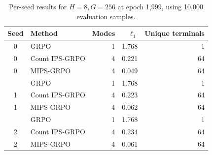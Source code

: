 \begin{table}[htbp]
\centering
\caption{Per-seed results for \(H=8,G=256\) at epoch 1,999, using 10,000
evaluation samples.}
\begin{tabular}{clrrr}
\toprule
Seed & Method & Modes & \(\ell_1\) & Unique terminals \\
\midrule
0 & GRPO & 1 & 1.768 & 1 \\
0 & Count IPS-GRPO & 4 & 0.221 & 64 \\
0 & MIPS-GRPO & 4 & 0.049 & 64 \\
\addlinespace
1 & GRPO & 1 & 1.768 & 1 \\
1 & Count IPS-GRPO & 4 & 0.223 & 64 \\
1 & MIPS-GRPO & 4 & 0.062 & 64 \\
\addlinespace
2 & GRPO & 1 & 1.768 & 1 \\
2 & Count IPS-GRPO & 4 & 0.234 & 64 \\
2 & MIPS-GRPO & 4 & 0.061 & 64 \\
\bottomrule
\end{tabular}
\end{table}

